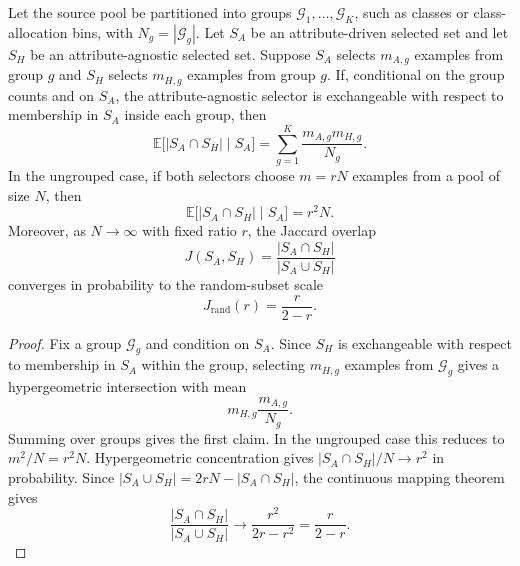 \begin{tcolorbox}[
    colback=blue!2!white,
    colframe=blue!20!white,
    arc=3pt,
    boxrule=1pt,
    drop shadow,
    breakable
]
\begin{proposition}
\label{prop:random-overlap-scale}
Let the source pool be partitioned into groups $\mathcal{G}_1,\ldots,\mathcal{G}_K$, such as classes or class-allocation bins, with $N_g=|\mathcal{G}_g|$. Let $S_A$ be an attribute-driven selected set and let $S_H$ be an attribute-agnostic selected set. Suppose $S_A$ selects $m_{A,g}$ examples from group $g$ and $S_H$ selects $m_{H,g}$ examples from group $g$. If, conditional on the group counts and on $S_A$, the attribute-agnostic selector is exchangeable with respect to membership in $S_A$ inside each group, then
\begin{equation}
\mathbb{E}\big[|S_A\cap S_H|\mid S_A\big]
=
\sum_{g=1}^K \frac{m_{A,g}m_{H,g}}{N_g}.
\end{equation}
In the ungrouped case, if both selectors choose $m=rN$ examples from a pool of size $N$, then
\begin{equation}
\mathbb{E}\big[|S_A\cap S_H|\mid S_A\big]=r^2N.
\end{equation}
Moreover, as $N\rightarrow\infty$ with fixed ratio $r$, the Jaccard overlap
\begin{equation}
J(S_A,S_H)=\frac{|S_A\cap S_H|}{|S_A\cup S_H|}
\end{equation}
converges in probability to the random-subset scale
\begin{equation}
J_{\mathrm{rand}}(r)=\frac{r}{2-r}.
\end{equation}
\end{proposition}
\end{tcolorbox}

\begin{tcolorbox}[
    colback=green!2!white,
    colframe=green!20!white,
    arc=3pt,
    boxrule=1pt,
    drop shadow,
    breakable
]
\begin{proof}
Fix a group $\mathcal{G}_g$ and condition on $S_A$. Since $S_H$ is exchangeable with respect to membership in $S_A$ within the group, selecting $m_{H,g}$ examples from $\mathcal{G}_g$ gives a hypergeometric intersection with mean
\begin{equation}
m_{H,g}\frac{m_{A,g}}{N_g}.
\end{equation}
Summing over groups gives the first claim. In the ungrouped case this reduces to $m^2/N=r^2N$. Hypergeometric concentration gives $|S_A\cap S_H|/N\rightarrow r^2$ in probability. Since $|S_A\cup S_H|=2rN-|S_A\cap S_H|$, the continuous mapping theorem gives
\begin{equation}
\frac{|S_A\cap S_H|}{|S_A\cup S_H|}
\rightarrow
\frac{r^2}{2r-r^2}
=
\frac{r}{2-r}.
\end{equation}
\end{proof}
\end{tcolorbox}

